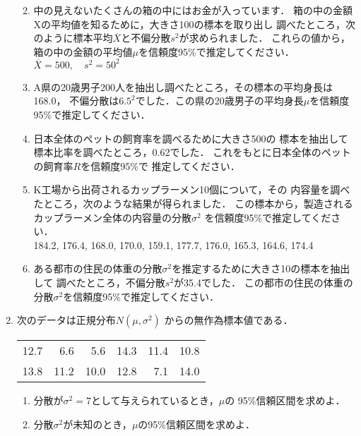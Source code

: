 \documentclass[12pt]{ltjsarticle}
\begin{document}
\begin{enumerate}
\begin{enumerate}
\cite[p.135]{wakui}
\item
中の見えないたくさんの箱の中にはお金が入っています．
箱の中の金額Xの平均値を知るために，大きさ100の標本を取り出し
調べたところ，次のように標本平均$\overline{X}$と不偏分散$s^2$が求められました．
これらの値から，箱の中の金額の平均値$\mu$を信頼度95\%で推定してください． \\
\hspace{1cm} $\overline{X} = 500, \quad s^2=50^2$\\
\cite[p.142]{wakui}
\item
A県の20歳男子200人を抽出し調べたところ，その標本の平均身長は168.0，
不偏分散は$6.5^2$でした．この県の20歳男子の平均身長$\mu$を信頼度
95\%で推定してください．
\cite[p.142]{wakui}
\item
日本全体のペットの飼育率を調べるために大きさ500の
標本を抽出して標本比率を調べたところ，0.62でした．
これをもとに日本全体のペットの飼育率$R$を信頼度95\%で
推定してください．
\cite[p.145]{wakui}
\item
K工場から出荷されるカップラーメン10個について，その
内容量を調べたところ，次のような結果が得られました．
この標本から，製造されるカップラーメン全体の内容量の分散$\sigma^2$
を信頼度95\%で推定してください．\\
\hspace{1cm} 184.2, 176.4, 168.0, 170.0, 159.1,
177.7, 176.0, 165.3, 164.6, 174.4 \\
\cite[p.147]{wakui}
\item
ある都市の住民の体重の分散$\sigma^2$を推定するために大きさ10の標本を抽出して
調べたところ，不偏分散$s^2$が35.4でした．
この都市の住民の体重の分散$\sigma^2$を信頼度95\%で推定してください．
\cite[p.149]{wakui}
\end{enumerate}
\item
次のデータは正規分布$N\left(\mu, \sigma^2\right)$
からの無作為標本値である．\cite[p.164]{inagaki}
\begin{table}[h]
\begin{center}
\begin{tabular}{rrrrrr}
12.7& 6.6& 5.6& 14.3& 11.4& 10.8 \\
13.8& 11.2& 10.0& 12.8& 7.1& 14.0
\end{tabular}
\end{center}
\end{table}
\begin{enumerate}
\item 分散が$\sigma^2=7$として与えられているとき，$\mu$の
95\%信頼区間を求めよ．
\item 分散$\sigma^2$が未知のとき，$\mu$の95\%信頼区間を求めよ．

\end{enumerate}
\end{enumerate}
\end{document}
